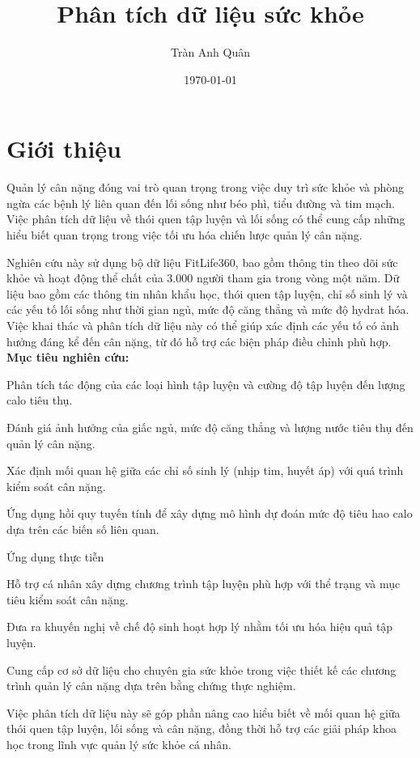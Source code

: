 \documentclass[a4paper,12pt]{article}
\begin{document}
\title{Phân tích dữ liệu sức khỏe}
\author{Tràn Anh Quân}
\date{\today}
\maketitle

\section{Giới thiệu}

Quản lý cân nặng đóng vai trò quan trọng trong việc duy trì sức khỏe và phòng ngừa các bệnh lý liên quan đến lối sống như béo phì, tiểu đường và tim mạch. Việc phân tích dữ liệu về thói quen tập luyện và lối sống có thể cung cấp những hiểu biết quan trọng trong việc tối ưu hóa chiến lược quản lý cân nặng.

Nghiên cứu này sử dụng bộ dữ liệu FitLife360, bao gồm thông tin theo dõi sức khỏe và hoạt động thể chất của 3.000 người tham gia trong vòng một năm. Dữ liệu bao gồm các thông tin nhân khẩu học, thói quen tập luyện, chỉ số sinh lý và các yếu tố lối sống như thời gian ngủ, mức độ căng thẳng và mức độ hydrat hóa. Việc khai thác và phân tích dữ liệu này có thể giúp xác định các yếu tố có ảnh hưởng đáng kể đến cân nặng, từ đó hỗ trợ các biện pháp điều chỉnh phù hợp.\\
\textbf{Mục tiêu nghiên cứu:}

Phân tích tác động của các loại hình tập luyện và cường độ tập luyện đến lượng calo tiêu thụ.

Đánh giá ảnh hưởng của giấc ngủ, mức độ căng thẳng và lượng nước tiêu thụ đến quản lý cân nặng.

Xác định mối quan hệ giữa các chỉ số sinh lý (nhịp tim, huyết áp) với quá trình kiểm soát cân nặng.

Ứng dụng hồi quy tuyến tính để xây dựng mô hình dự đoán mức độ tiêu hao calo dựa trên các biến số liên quan.

Ứng dụng thực tiễn

Hỗ trợ cá nhân xây dựng chương trình tập luyện phù hợp với thể trạng và mục tiêu kiểm soát cân nặng.

Đưa ra khuyến nghị về chế độ sinh hoạt hợp lý nhằm tối ưu hóa hiệu quả tập luyện.

Cung cấp cơ sở dữ liệu cho chuyên gia sức khỏe trong việc thiết kế các chương trình quản lý cân nặng dựa trên bằng chứng thực nghiệm.

Việc phân tích dữ liệu này sẽ góp phần nâng cao hiểu biết về mối quan hệ giữa thói quen tập luyện, lối sống và cân nặng, đồng thời hỗ trợ các giải pháp khoa học trong lĩnh vực quản lý sức khỏe cá nhân.
\end{document}
